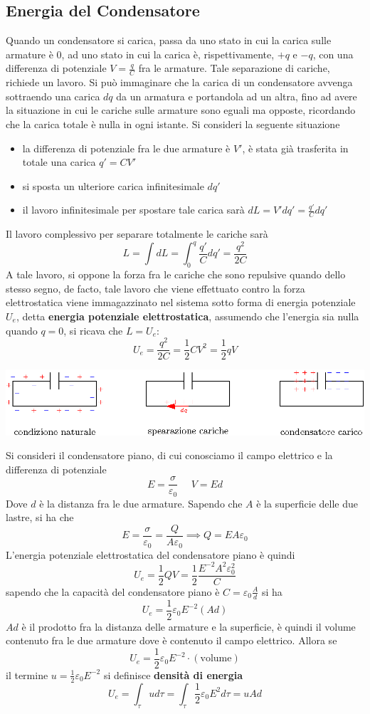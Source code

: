 \documentclass[10pt, letterpaper]{report}
\begin{document}
\subsection{Energia del Condensatore}
Quando un condensatore si carica, passa da uno stato in cui la carica sulle armature è 0, ad uno stato in cui la carica è, rispettivamente, $+q$ e $-q$, con una differenza di potenziale $V=\frac{q}{C}$ fra le armature. Tale separazione di cariche, richiede un lavoro. Si può immaginare che la carica di un condensatore avvenga sottraendo una carica $dq$ da un armatura e portandola ad un altra, fino ad avere la situazione in cui le cariche sulle armature sono eguali ma opposte, ricordando che la carica totale è nulla in ogni istante.\acc 
Si consideri la seguente situazione \begin{itemize}
    \item la differenza di potenziale fra le due armature è $V'$, è stata già trasferita in totale una carica $q'=CV'$
    \item si sposta un ulteriore carica infinitesimale $dq'$
    \item il lavoro infinitesimale per spostare tale carica sarà $dL=V'dq'=\frac{q'}{C}dq'$
\end{itemize}
Il lavoro complessivo per separare totalmente le cariche sarà 
$$L=\int dL = \int_0^q \frac{q'}{C}dq'=\frac{q^2}{2C} $$
A tale lavoro, si oppone la forza fra le cariche che sono repulsive quando dello stesso segno, de facto, tale lavoro che viene effettuato contro la forza elettrostatica viene immagazzinato nel sistema sotto forma di energia potenziale $U_e$, detta \textbf{energia potenziale elettrostatica}, assumendo che l'energia sia nulla quando $q=0$, si ricava che $L=U_e$:
$$ U_e=\frac{q^2}{2C}=\frac{1}{2}CV^2=\frac{1}{2}qV$$
\begin{center}
    \includegraphics[width=\textwidth]{images/caricaCondensatore.eps}
\end{center} 
Si consideri il condensatore piano, di cui conosciamo il campo elettrico e la differenza di potenziale 
$$ E=\frac{\sigma}{\varepsilon_0} \ \ \ \ \ \ V=Ed$$
Dove $d$ è la distanza fra le due armature. Sapendo che $A$ è la superficie delle due lastre, si ha che 
$$ E=\frac{\sigma}{\varepsilon_0} = \frac{Q}{A\varepsilon_0}\implies Q=EA\varepsilon_0$$
L'energia potenziale elettrostatica del condensatore piano è quindi 
$$ U_e=\frac{1}{2}QV=\frac{1}{2}\frac{E^{-2}A^2\varepsilon_0^2}{C}$$ sapendo che la capacità del condensatore piano è $C=\varepsilon_0\frac{A}{d}$ si ha 
$$ U_e=\frac{1}{2}\varepsilon_0E^{-2}(Ad)$$ 
$Ad$ è il prodotto fra la distanza delle armature e la superficie, è quindi il volume contenuto fra le due armature dove è contenuto il campo elettrico. Allora se $$ U_e=\frac{1}{2}\varepsilon_0E^{-2}\cdot (\text{volume})$$ 
il termine $u=\frac{1}{2}\varepsilon_0E^{-2}$ si definisce \textbf{densità di energia}
$$ U_e=\int_\tau ud\tau = \int_\tau \frac{1}{2}\varepsilon_0E^2d\tau = uAd$$
\end{document}
